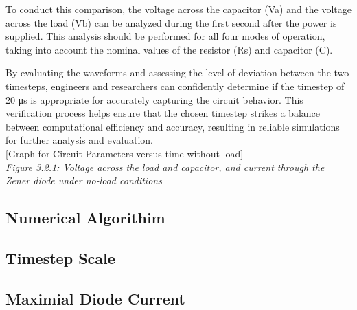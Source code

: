 To conduct this comparison, the voltage across the capacitor (Va) and the voltage across the load (Vb) can be analyzed during the first second after the power is supplied. This analysis should be performed for all four modes of operation, taking into account the nominal values of the resistor (Rs) and capacitor (C).

By evaluating the waveforms and assessing the level of deviation between the two timesteps, engineers and researchers can confidently determine if the timestep of 20 μs is appropriate for accurately capturing the circuit behavior. This verification process helps ensure that the chosen timestep strikes a balance between computational efficiency and accuracy, resulting in reliable simulations for further analysis and evaluation.\\

[Graph for Circuit Parameters versus time without load]\\

\emph{Figure 3.2.1: Voltage across the load and capacitor, and current through the Zener diode under no-load conditions}\\


















\subsection{Numerical Algorithim}
\subsection{Timestep Scale}
\subsection{Maximial Diode Current}